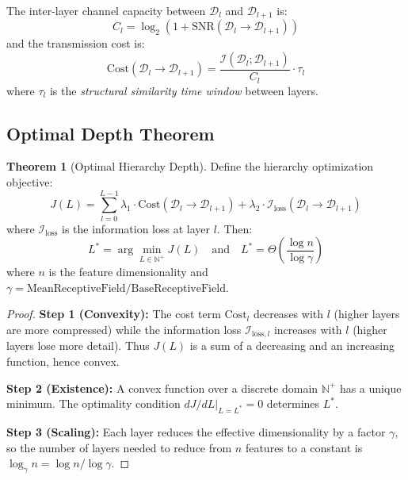 \documentclass[12pt]{article}
\theoremstyle{definition}
\newtheorem{theorem}[definition]{Theorem}
\theoremstyle{remark}
\begin{document}
The inter-layer channel capacity between $\mathcal{D}_l$ and $\mathcal{D}_{l+1}$ is:
\begin{equation}
C_l = \log_2(1 + \mathrm{SNR}(\mathcal{D}_l \to \mathcal{D}_{l+1}))
\end{equation}
and the transmission cost is:
\begin{equation}
\mathrm{Cost}(\mathcal{D}_l \to \mathcal{D}_{l+1}) = \frac{\mathcal{I}(\mathcal{D}_l; \mathcal{D}_{l+1})}{C_l} \cdot \tau_l
\end{equation}
where $\tau_l$ is the \emph{structural similarity time window} between layers.

\subsection{Optimal Depth Theorem}

\begin{theorem}[Optimal Hierarchy Depth]\label{thm:optimal-depth}
Define the hierarchy optimization objective:
\begin{equation}
J(L) = \sum_{l=0}^{L-1} \lambda_1 \cdot \mathrm{Cost}(\mathcal{D}_l \to \mathcal{D}_{l+1}) + \lambda_2 \cdot \mathcal{I}_{\mathrm{loss}}(\mathcal{D}_l \to \mathcal{D}_{l+1})
\end{equation}
where $\mathcal{I}_{\mathrm{loss}}$ is the information loss at layer $l$. Then:
\begin{equation}
L^* = \arg\min_{L \in \mathbb{N}^+} J(L) \quad \text{and} \quad L^* = \Theta\left(\frac{\log n}{\log \gamma}\right)
\end{equation}
where $n$ is the feature dimensionality and $\gamma = \mathrm{MeanReceptiveField} / \mathrm{BaseReceptiveField}$.
\end{theorem}

\begin{proof}
\textbf{Step 1 (Convexity):} The cost term $\mathrm{Cost}_l$ decreases with $l$ (higher layers are more compressed) while the information loss $\mathcal{I}_{\mathrm{loss}, l}$ increases with $l$ (higher layers lose more detail). Thus $J(L)$ is a sum of a decreasing and an increasing function, hence convex.

\textbf{Step 2 (Existence):} A convex function over a discrete domain $\mathbb{N}^+$ has a unique minimum. The optimality condition $dJ/dL|_{L=L^*} = 0$ determines $L^*$.

\textbf{Step 3 (Scaling):} Each layer reduces the effective dimensionality by a factor $\gamma$, so the number of layers needed to reduce from $n$ features to a constant is $\log_\gamma n = \log n / \log \gamma$.
\end{proof}
\end{document}
